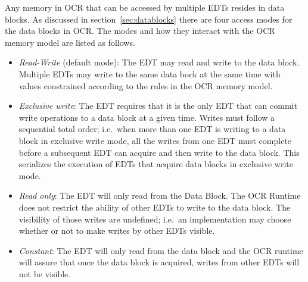 Any memory in OCR that can be accessed by multiple EDTs resides in data blocks.  As
discussed in section~\ref{sec:datablocks} there
are four access modes for the data blocks in OCR. The modes and how they
interact with the OCR memory model are listed as follows.
\begin{itemize}

\item \emph{Read-Write} (default mode): The EDT may read
and write to the data block.  Multiple EDTs may
write to the same data bock at the same time with values constrained according to the
rules in the OCR memory model.

\item \emph{Exclusive write}: The
EDT requires that it is the only EDT that can commit write operations to a data block at a
given time.  Writes must follow a sequential total order; i.e.\ when more than one EDT is writing
to a data block in exclusive write mode, all the writes from one EDT must complete before
a subsequent EDT can acquire and then write to the data block.  This serializes the execution of
EDTs that acquire data blocks in exclusive write mode.

\item \emph{Read only}: The EDT
will only read from the Data Block. The OCR Runtime does
not restrict the ability of other EDTs to write to the data block.  The
visibility of those writes are undefined; i.e.\ an implementation may
choose whether or not to make writes by other EDTs visible.

\item \emph{Constant}: The EDT will only read from the
data block and the OCR runtime will assure that once the data block is acquired,
writes from other EDTs will not be visible.

\end{itemize}


